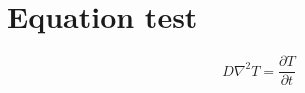 \documentclass[float=false, crop=false]{standalone}
\begin{document}
\section{Equation test}\label{sec:eqntest}
\begin{equation}
D\nabla^2T=\frac{\partial T}{\partial t}
\end{equation}
\end{document}
